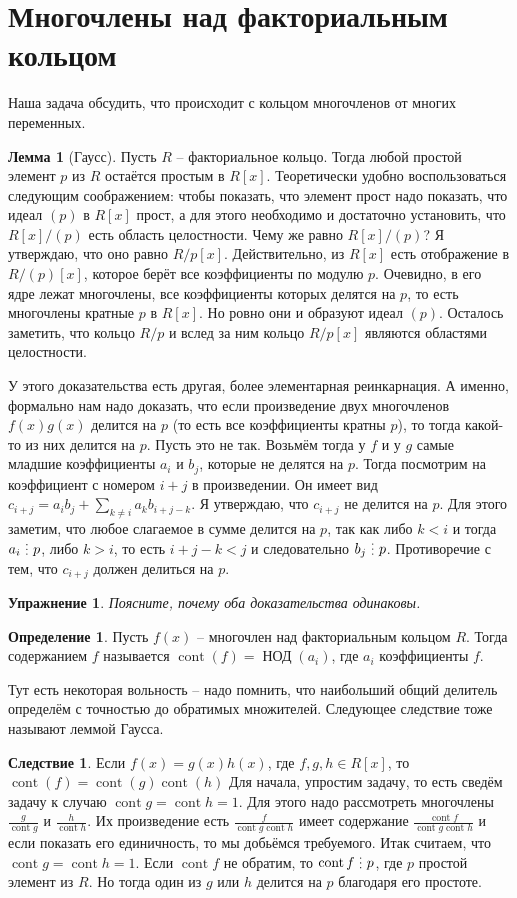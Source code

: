 \documentclass[10pt,a4paper,oneside]{book}
\newtheorem{upr}{Упражнение}
\theoremstyle{definition}
\newtheorem*{defn}{{\color{yellow!30!red} Определение}}
\newtheorem{lem}{{\color{green!50!black} Лемма}}
\newtheorem{cor}{Следствие}
\newcommand{\cnt}{\operatorname{cont}}
\newcommand{\di}{\mathop{\,\scalebox{0.85}{\raisebox{-1.2pt}[0.5\height]{\vdots}}\,}}
\newcommand{\Nod}{\operatorname{\text{НОД}}}
\def\dfn{\begin{defn}}
\def\edfn{\end{defn}}
\def\lm{\begin{lem}}
\def\elm{\end{lem}}
\def\crl{\begin{cor}}
\def\ecrl{\end{cor}}
\def\bupr{\begin{upr}}
\def\eupr{\end{upr}}
\begin{document}
\section{Многочлены над факториальным кольцом}

Наша задача обсудить, что происходит с кольцом многочленов от многих переменных.


\lm[Гаусс] Пусть $R$ -- факториальное кольцо. Тогда любой простой элемент $p$ из $R$ остаётся простым в $R[x]$.
\proof
Теоретически удобно воспользоваться следующим соображением: чтобы показать, что элемент прост надо показать, что идеал $(p)$ в $R[x]$ прост, а для этого необходимо и достаточно установить, что $R[x]/(p)$ есть область целостности. Чему же равно $R[x]/(p)$? Я утверждаю, что оно равно $R/p[x]$. Действительно, из $R[x]$ есть отображение в $R/(p)[x]$, которое берёт все коэффициенты по модулю $p$. Очевидно, в его ядре лежат многочлены, все коэффициенты которых делятся на $p$, то есть многочлены кратные $p$ в $R[x]$. Но ровно они и образуют идеал $(p)$. Осталось заметить, что кольцо $R/p$ и вслед за ним кольцо $R/p[x]$ являются областями целостности.

У этого доказательства есть другая, более элементарная реинкарнация. А именно, формально нам надо доказать, что если произведение двух многочленов $f(x)g(x)$ делится на $p$ (то есть все коэффициенты кратны $p$), то тогда какой-то из них делится на $p$. Пусть это не так. Возьмём тогда у $f$ и у $g$ самые младшие коэффициенты $a_i$ и  $b_j$, которые не делятся на $p$. Тогда посмотрим на коэффициент с номером $i+j$  в произведении. Он имеет вид $c_{i+j}= a_ib_j + \sum_{k \neq i} a_k b_{i+j -k}$. Я утверждаю, что $c_{i+j}$ не делится на $p$. Для этого заметим, что любое слагаемое в сумме делится на $p$, так как либо $k<i$ и тогда $a_i \di p$, либо $k>i$, то есть $i+j-k<j$ и следовательно $b_j \di p$. Противоречие с тем, что $c_{i+j}$ должен делиться на $p$.   
\endproof
\elm

\bupr Поясните, почему оба доказательства одинаковы.
\eupr

\dfn Пусть $f(x)$ -- многочлен над факториальным кольцом $R$. Тогда содержанием $f$ называется $\cnt(f)=\Nod (a_i)$, где $a_i$ коэффициенты $f$. 
\edfn

Тут есть некоторая вольность -- надо помнить, что наибольший общий делитель определём с точностью до обратимых множителей. Следующее следствие тоже называют леммой Гаусса.

\crl Если $f(x)=g(x)h(x)$, где $f,g,h \in R[x]$, то $\cnt(f)=\cnt(g)\cnt(h)$
\proof Для начала, упростим задачу, то есть сведём задачу к случаю $\cnt g= \cnt h =1$. Для этого надо рассмотреть многочлены $\frac{g}{\cnt g}$ и $\frac{h}{\cnt h}$. Их произведение есть $\frac{f}{\cnt{g}\cnt{h}}$ имеет содержание $\frac{\cnt f}{\cnt g \cnt h}$ и если показать его единичность, то мы добьёмся требуемого. Итак считаем, что $\cnt g= \cnt h=1$. Если $\cnt f$ не обратим, то $\cnt f \di p$, где $p$ простой элемент из $R$. Но тогда один из $g$ или $h$ делится на $p$ благодаря его простоте. 
\endproof
\ecrl
\end{document}
